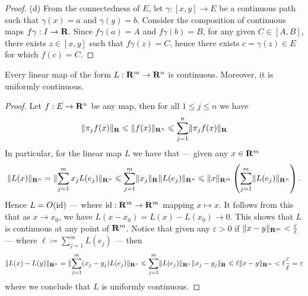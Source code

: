 \begin{proof}
(d) From the connectedness of \(E\), let \(\gamma: [x, y] \to E\) be a
continuous path such that \(\gamma(x) = a\) and \(\gamma(y) = b\). Consider
the composition of continuous maps \(f  \gamma: I \to \mathbf{R}\). Since \(f
\gamma(a) = A\) and \(f  \gamma(b) = B\), for any given \(C \in [A,
B]\), there exists \(z \in [x, y]\) such that \(f  \gamma(z) = C\), hence
there exists \(c = \gamma(z) \in E\) for which \(f(c) = C\).
\end{proof}

\begin{proposition}\label{prop: linear-continuous}
Every linear map of the form \(L: \mathbf{R}^m \to \mathbf{R}^n\) is continuous. Moreover, it
is uniformly continuous.
\end{proposition}

\begin{proof}
Let \(f: E \to \mathbf{R}^n\) be any map, then for all \(1 \leq j \leq n\) we have
\[
\lVert\pi_j  f(x)\rVert_{\mathbf{R}} \leqslant \lVert f(x)\rVert_{\mathbf{R}^n} \leqslant \sum_{j=1}^n
\lVert\pi_j  f(x)\rVert_{\mathbf{R}}
\]
In particular, for the linear map \(L\) we have that --- given any \(x \in
\mathbf{R}^m\)
\[
\lVert L(x)\rVert_{\mathbf{R}^n} = \lVert\sum_{j=1}^m x_j L(e_j)\rVert_{\mathbf{R}^n}
\leqslant \sum_{j=1}^m \lVert x_j\rVert_{\mathbf{R}} \lVert L(e_j)\rVert_{\mathbf{R}^n}
\leqslant \lVert x\rVert_{\mathbf{R}^m} \left( \sum_{j=1}^m \lVert L(e_j)\rVert_{\mathbf{R}^n} \right).
\]
Hence \(L = O(\operatorname{id})\) --- where \(\operatorname{id}: \mathbf{R}^m \to \mathbf{R}^m\) mapping \(x \mapsto x\). It
follows from this that as \(x \to x_0\), we have \(L(x - x_0) = L(x) - L(x_0) \to
0\). This shows that \(L\) is continuous at any point of \(\mathbf{R}^m\). Notice that
given any \(\varepsilon > 0\) if \(\lVert x - y\rVert_{\mathbf{R}^m} < \frac \varepsilon \ell\) --- where \(\ell \coloneq
\sum_{j=1}^m L(e_j)\) --- then
\[
\lVert L(x) - L(y)\rVert_{\mathbf{R}^n} = \lVert\sum_{j=1}^m (x_j - y_j) L(e_j) \rVert_{\mathbf{R}^n}
\leqslant \sum_{j=1}^m \lVert L(e_j)\rVert_{\mathbf{R}^n} \lVert x_j - y_j\rVert_{\mathbf{R}}
\leqslant \ell \lVert x - y\rVert_{\mathbf{R}^m}
< \ell \frac \varepsilon \ell = \varepsilon
\]
where we conclude that \(L\) is uniformly continuous.
\end{proof}
